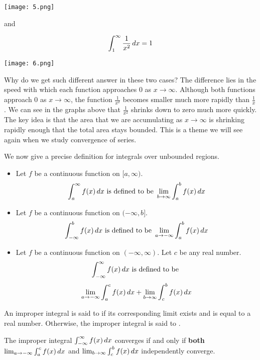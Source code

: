 \documentclass{ximera}
\begin{document}
\begin{image}
   \texttt{[image: 5.png]}
\end{image}

and 

\[
\int_{1}^{\infty} \frac{1}{x^2} \mathop{}\!d x =1
\]


\begin{image}
   \texttt{[image: 6.png]}
\end{image}

Why do we get such different answer in these two cases?  The difference lies in the speed with which each function approaches $0$ as $x \to \infty$. Although both functions approach $0$ as $x \to \infty$, the function $\frac{1}{x^2}$ becomes smaller much more rapidly than $\frac{1}{x}$. 
We can see in the graphs above that $\frac{1}{x^2}$ shrinks down to zero much more quickly. The key idea is that the area that we are accumulating as $x\to \infty$ is shrinking rapidly enough that the total area stays bounded. This is a theme we will see again when we study convergence of series. 

We now give a precise definition for integrals over unbounded regions.

\begin{definition}\hfil
\begin{itemize}
\item Let $f$ be a continuous function on $[a,\infty)$.
  \[
  \int_a^\infty f(x) \mathop{}\!d x \text{ is defined to be } \lim_{b\to\infty}\int_a^b f(x) \mathop{}\!d x
  \]
\item Let $f$ be a continuous function on $(-\infty,b]$.
  \[
  \int_{-\infty}^b f(x) \mathop{}\!d x \text{ is defined to be } \lim_{a\to-\infty}\int_a^b f(x) \mathop{}\!d x
  \]
\item Let $f$ be a continuous function on $(-\infty,\infty)$. Let $c$
  be any real number.
  \[
  \int_{-\infty}^\infty f(x) \mathop{}\!d x \text{ is defined to be }
  \]
  \[
  \lim_{a\to-\infty}\int_a^c f(x) \mathop{}\!d x + \lim_{b\to\infty}\int_c^b
  f(x) \mathop{}\!d x
  \]
\end{itemize}
An improper integral is said to  if its corresponding
limit exists and is equal to a real number. Otherwise, the improper
integral is said to . 
\end{definition}

\begin{warning}
  The improper integral $  \int_{-\infty}^\infty f(x) \mathop{}\!d x$ converges if and only if \textbf{both}  $ \lim_{a\to-\infty}\int_a^c f(x) \mathop{}\!d x$
and $  \lim_{b\to\infty}\int_c^b f(x) \mathop{}\!d x$
independently converge.
\end{warning}
\end{document}
